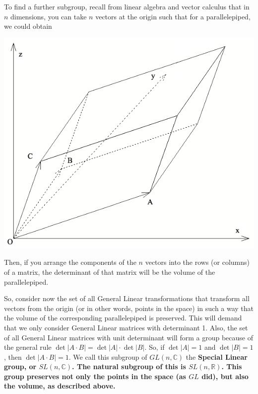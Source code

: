 \documentclass[12pt,epsf]{article}
\begin{document}
To find a further subgroup, recall from linear algebra and vector
calculus that in $n$ dimensions, you can take $n$ vectors at the origin
such that for a parallelepiped, we could obtain
\begin{center}
\includegraphics[scale=.3]{Parallelepiped.PNG}
\end{center}

Then, if you arrange the components of the $n$ vectors into the rows
(or columns) of a matrix, the determinant of that matrix will be the
volume of the parallelepiped.  

So, consider now the set of all General Linear transformations that
transform all vectors from the origin (or in other words, points in the
space) in such a way that the volume of the corresponding
parallelepiped is preserved.  This will demand that we only consider
General Linear matrices with determinant 1.  Also, the set of all
General Linear matrices with unit determinant will form a group because
of the general rule $\det|A\cdot B| = \det|A|\cdot \det|B|$.  So, if
$\det|A|=1$ and $\det|B|=1$, then $\det|A\cdot B| = 1$.  We call this
subgroup of $GL(n,\mathbb{C})$ the \bf Special Linear \rm group, or
$SL(n,\mathbb{C})$.  The natural subgroup of this is
$SL(n,\mathbb{R})$.  This group preserves not only the points in the
space (as $GL$ did), but also the volume, as described above.  
\end{document}
